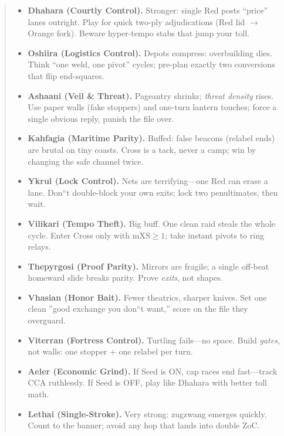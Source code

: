 \documentclass[11pt]{article}
\begin{document}
\begin{quote}
\begin{tcolorbox}[enhanced,breakable,title={4$\times$4 Pocket Diamond --- What Changes},
  colback=white,colframe=royal,boxrule=0.8pt]
\begin{itemize}[leftmargin=1.1em,itemsep=0.3em]
\item \textbf{Dhahara (Courtly Control).} Stronger: single Red posts ``price'' lanes outright. Play for quick two-ply adjudications (Red lid $\rightarrow$ Orange fork). Beware hyper-tempo stabs that jump your toll.

\item \textbf{Oshiira (Logistics Control).} Depots compress: overbuilding dies. Think ``one weld, one pivot'' cycles; pre-plan exactly two conversions that flip end-squares.

\item \textbf{Ashaani (Veil \& Threat).} Pageantry shrinks; \emph{threat density} rises. Use paper walls (fake stoppers) and one-turn lantern touches; force a single obvious reply, punish the file over.

\item \textbf{Kahfagia (Maritime Parity).} Buffed: false beacons (relabel ends) are brutal on tiny coasts. Cross is a tack, never a camp; win by changing the safe channel twice.

\item \textbf{Ykrul (Lock Control).} Nets are terrifying---one Red can erase a lane. Don``t double-block your own exits; lock two penultimates, then wait.

\item \textbf{Vilikari (Tempo Theft).} Big buff. One clean raid steals the whole cycle. Enter Cross only with mXS$\ge1$; take instant pivots to ring relays.

\item \textbf{Thepyrgosi (Proof Parity).} Mirrors are fragile; a single off-beat homeward slide breaks parity. Prove \emph{exits}, not shapes.

\item \textbf{Vhasian (Honor Bait).} Fewer theatrics, sharper knives. Set one clean ''good exchange you don``t want,'' score on the file they overguard.

\item \textbf{Viterran (Fortress Control).} Turtling fails---no space. Build \emph{gates}, not walls: one stopper + one relabel per turn.

\item \textbf{Aeler (Economic Grind).} If Seed is ON, cap races end fast---track CCA ruthlessly. If Seed is OFF, play like Dhahara with better toll math.

\item \textbf{Lethai (Single-Stroke).} Very strong: zugzwang emerges quickly. Count to the banner; avoid any hop that lands into double ZoC.


\end{itemize}
\end{tcolorbox}
\end{quote}
\end{document}
